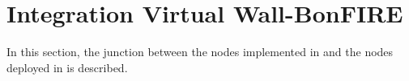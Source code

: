 \section{Integration Virtual Wall-BonFIRE}

In this section, the junction between the nodes implemented in \vw and the nodes
deployed in \bonfire is described.
